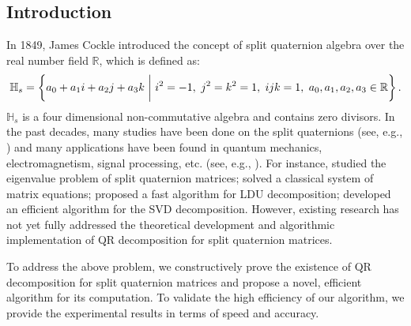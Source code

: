 \documentclass{book}
\theoremstyle{remark}
\begin{document}
\begin{multicols}{2}
\section{Introduction}
\vspace{-6pt}
In 1849, James Cockle \cite{Cockle1849} introduced the concept of split quaternion algebra over the real number field $\mathbb{R}$, which is defined as:
\begin{equation*}
    \small
    \mathbb{H}_s = \left\{ a_0 + a_1 i + a_2 j + a_3 k \ \bigg| \ i^2 = -1,\ j^2 = k^2 = 1, \ ijk = 1, \ a_0, a_1, a_2, a_3 \in \mathbb{R}\right\}. 
\end{equation*} 
$\mathbb{H}_s$ is a four dimensional non-commutative algebra and contains zero divisors. In the past decades, many studies have been done on the split quaternions (see, e.g., \cite{AR2020,Yasemin2012,TJiang2015,Jiang2018,TJiang2018,Zhuo2020,Yang2020,mma2023,wang2024,Wang2021,Gang2024,yuan2017,Zhang2015}) and  many applications have been found in quantum mechanics, electromagnetism, signal processing, etc. (see, e.g., \cite{Gog2022, Hasebe2010, Le2022, Z2022, Wang2023}). For instance, \cite{Jiang2018} studied the eigenvalue problem of split quaternion matrices; \cite{wang2024} solved a classical system of matrix equations; 
 \cite{Wang2021} proposed a fast algorithm for LDU decomposition; \cite{Gang2024} developed an efficient algorithm for the SVD decomposition. However, existing research has not yet fully addressed the theoretical development and algorithmic implementation of QR decomposition for split quaternion matrices.

To address the above problem, we constructively prove the existence of QR decomposition for split quaternion matrices and propose a novel, efficient algorithm for its computation. To validate the high efficiency of our algorithm, we provide the experimental results in terms of speed and accuracy.


\end{multicols}
\end{document}
